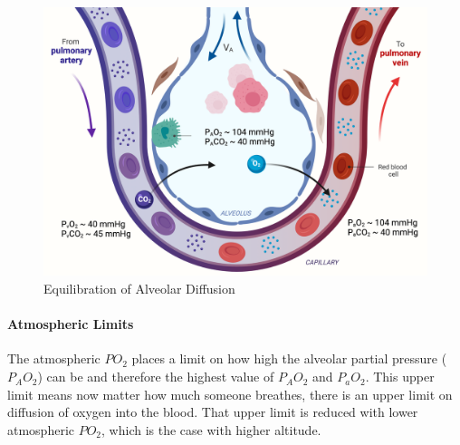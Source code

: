 \begin{figure}[!h]
    \centering
    \includegraphics[width=1.0\linewidth]{./figure/alveolar_equilibration.png}
    \caption{Equilibration of Alveolar Diffusion}
    \label{fig:alveolar_equilibration}
\end{figure}

\paragraph{Atmospheric Limits}

The atmospheric $PO_2$ places a limit on how high the alveolar partial pressure ($P_AO_2$) can be and therefore the highest value of $P_AO_2$ and $P_aO_2$. This upper limit means now matter how much someone breathes, there is an upper limit on diffusion of oxygen into the blood. That upper limit is reduced with lower atmospheric $PO_2$, which is the case with higher altitude. 


